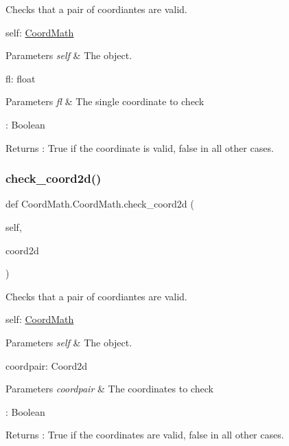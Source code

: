 Checks that a pair of coordiantes are valid. 

self\+: \hyperlink{classCoordMath_1_1CoordMath}{Coord\+Math} 
\begin{DoxyParams}{Parameters}
{\em self} & The object.\\
\hline
\end{DoxyParams}
fl\+: float 
\begin{DoxyParams}{Parameters}
{\em fl} & The single coordinate to check\\
\hline
\end{DoxyParams}
\+: Boolean \begin{DoxyReturn}{Returns}
\+: True if the coordinate is valid, false in all other cases. 
\end{DoxyReturn}
\mbox{\label{classCoordMath_1_1CoordMath_a49b075576d09bad607669194c9010f27}} 
\subsubsection{\texorpdfstring{check\+\_\+coord2d()}{check\_coord2d()}}
{\footnotesize\ttfamily def Coord\+Math.\+Coord\+Math.\+check\+\_\+coord2d (\begin{DoxyParamCaption}\item[{}]{self,  }\item[{}]{coord2d }\end{DoxyParamCaption})}



Checks that a pair of coordiantes are valid. 

self\+: \hyperlink{classCoordMath_1_1CoordMath}{Coord\+Math} 
\begin{DoxyParams}{Parameters}
{\em self} & The object.\\
\hline
\end{DoxyParams}
coordpair\+: Coord2d 
\begin{DoxyParams}{Parameters}
{\em coordpair} & The coordinates to check\\
\hline
\end{DoxyParams}
\+: Boolean \begin{DoxyReturn}{Returns}
\+: True if the coordinates are valid, false in all other cases. 
\end{DoxyReturn}
\mbox{\label{classCoordMath_1_1CoordMath_a74cc0e28ecefcbab5481cdc3fdcc9561}} 
